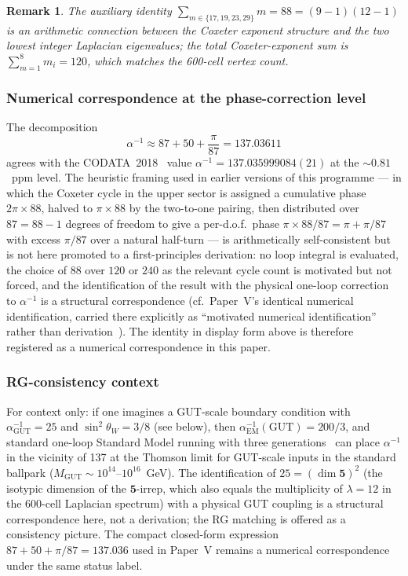 \documentclass[12pt]{article}
\newtheorem{remark}[theorem]{Remark}
\begin{document}
\begin{remark}
The auxiliary identity $\sum_{m \in \{17, 19, 23, 29\}} m = 88 = (9 - 1)(12 - 1)$ is an arithmetic connection between the Coxeter exponent structure and the two lowest integer Laplacian eigenvalues; the total Coxeter-exponent sum is $\sum_{m = 1}^{8} m_i = 120$, which matches the 600-cell vertex count.
\end{remark}

\subsubsection*{Numerical correspondence at the phase-correction level}

The decomposition
\begin{equation}
    \alpha^{-1} \approx 87 + 50 + \frac{\pi}{87} = 137.03611
\end{equation}
agrees with the CODATA~2018~\citep{CODATA2018} value $\alpha^{-1} = 137.035999084(21)$ at the $\sim 0.81$~ppm level. The heuristic framing used in earlier versions of this programme --- in which the Coxeter cycle in the upper sector is assigned a cumulative phase $2\pi \times 88$, halved to $\pi \times 88$ by the two-to-one pairing, then distributed over $87 = 88 - 1$ degrees of freedom to give a per-d.o.f.\ phase $\pi \times 88 / 87 = \pi + \pi/87$ with excess $\pi/87$ over a natural half-turn --- is arithmetically self-consistent but is not here promoted to a first-principles derivation: no loop integral is evaluated, the choice of $88$ over $120$ or $240$ as the relevant cycle count is motivated but not forced, and the identification of the result with the physical one-loop correction to $\alpha^{-1}$ is a structural correspondence (cf.\ Paper~V's identical numerical identification, carried there explicitly as ``motivated numerical identification'' rather than derivation~\citep{SmartV}). The identity in display form above is therefore registered as a numerical correspondence in this paper.

\subsubsection*{RG-consistency context}

For context only: if one imagines a GUT-scale boundary condition with $\alpha^{-1}_{\mathrm{GUT}} = 25$ and $\sin^2\theta_W = 3/8$ (see below), then $\alpha^{-1}_{\mathrm{EM}}(\mathrm{GUT}) = 200/3$, and standard one-loop Standard Model running with three generations~\citep{Langacker1981} can place $\alpha^{-1}$ in the vicinity of 137 at the Thomson limit for GUT-scale inputs in the standard ballpark ($M_{\mathrm{GUT}} \sim 10^{14}$--$10^{16}$~GeV). The identification of $25 = (\dim \mathbf{5})^2$ (the isotypic dimension of the $\mathbf{5}$-irrep, which also equals the multiplicity of $\lambda = 12$ in the 600-cell Laplacian spectrum) with a physical GUT coupling is a structural correspondence here, not a derivation; the RG matching is offered as a consistency picture. The compact closed-form expression $87 + 50 + \pi/87 = 137.036$ used in Paper~V remains a numerical correspondence under the same status label.
\end{document}
